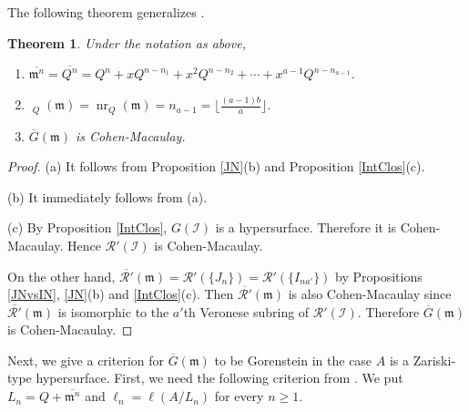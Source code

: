 \documentclass[12pt]{amsart}
\newtheorem{thm}{Theorem}[section]
\theoremstyle{definition}
\theoremstyle{remark}
\numberwithin{equation}{section}
\newcommand{\m}{{\mathfrak m}}
\DeclareMathOperator{\nr}{{nr}}
\DeclareMathOperator{\br}{\bar r}
\begin{document}
\par \vspace{2mm}
The following theorem generalizes \cite[Theorem 3.1]{OWY2019}. 

\begin{thm} \label{S1-Main}
Under the notation as above, 
\begin{enumerate}
\item[\rm{(a)}] $\overline{\m^{n}}=\overline{Q^n}=Q^n
+xQ^{n-n_1}+x^2Q^{n-n_2}+\cdots+x^{a-1}Q^{n-n_{a-1}}$. 
\item[\rm{(b)}] $\br_Q(\m)=\nr_Q(\m)=n_{a-1}= \lfloor \frac{(a-1)b}{a}\rfloor$. 
\item[\rm{(c)}] $\overline{G}(\m)$ is Cohen-Macaulay. 
\end{enumerate}
\end{thm}

\begin{proof}
(a) It follows from Proposition \ref{JN}(b) and Proposition \ref{IntClos}(c). 
\par \vspace{2mm} \par \noindent 
(b) It immediately follows from (a). 
\par \vspace{2mm} \par \noindent 
(c) By Proposition \ref{IntClos}, $G(\mathcal{I})$ is a hypersurface. Therefore it is Cohen-Macaulay. 
Hence $\mathcal{R}'(\mathcal{I})$ is Cohen-Macaulay. 
\par \vspace{2mm}
On the other hand, 
$\overline{\mathcal{R}'}(\m)=\mathcal{R}'(\{J_n\})= 
\mathcal{R}'(\{I_{na'}\})$ by  Propositions \ref{JNvsIN}, \ref{JN}(b) and \ref{IntClos}(c). 
Then $\overline{\mathcal{R}'}(\m)$  is also Cohen-Macaulay since $\overline{\mathcal{R}'}(\m)$ is isomorphic to the $a'$th Veronese 
subring of $\mathcal{R}'(\mathcal{I})$. 
Therefore $\overline{G}(\m)$ is Cohen-Macaulay. 
\end{proof}

\bigskip 
\par  \vspace{2mm}
Next, we give a criterion for $\overline{G}(\m)$ to be 
Gorenstein in the case $A$ is a Zariski-type hypersurface. 
First, we need the following criterion from \cite{OWY7}. 
We put $L_n=Q+\overline{\m^{n}}$ and $\ell_n=\ell(A/L_n)$ 
for every $n \ge 1$. 
\end{document}
